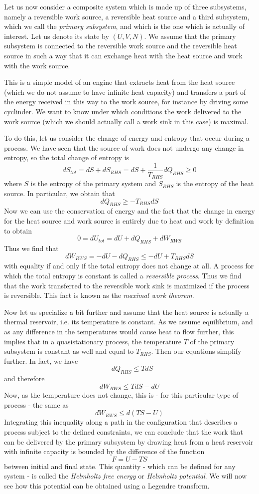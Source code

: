\documentclass[a4paper, draft]{article}
\theoremstyle{own}
\theoremstyle{remark}
\begin{document}
Let us now consider a composite system which is made up of three subsystems, namely a reversible work source, a reversible heat source and a third subsystem, which we call the {\em primary subsystem}, and which is the one which is actually of interest. Let us denote its state by $(U,V,N)$. We assume that the primary subsystem is connected to the reversible work source and the reversible heat source in such a way that it can exchange heat with the heat source and work with the work source.

This is a simple model of an engine that extracts heat from the heat source (which we do not assume to have infinite heat capacity) and transfers a part of the energy received in this way to the work source, for instance by driving some cyclinder. We want to know under which conditions the work delivered to the work source (which we should actually call a work sink in this case) is maximal.

To do this, let us consider the change of energy and entropy that occur during a process. We have seen that the source of work does not undergo any change in entropy, so the total change of entropy is
$$
dS_{tot} = dS + dS_{RHS} = dS + \frac{1}{T_{RHS}} dQ_{RHS} \geq 0
$$
where $S$ is the entropy of the primary system and $S_{RHS}$ is the entropy of the heat source. In particular, we obtain that
$$
dQ_{RHS} \geq - T_{RHS} dS
$$
Now we can use the conservation of energy and the fact that the change in energy for the heat source and work source is entirely due to heat and work by definition to obtain
$$
0 = dU_{tot} = dU + dQ_{RHS} + dW_{RWS}
$$
Thus we find that
$$
dW_{RWS} = - dU - dQ_{RHS} \leq -dU + T_{RHS} dS
$$
with equality if and only if the total entropy does not change at all. A process for which the total entropy is constant is called a {\em reversible process}. Thus we find that the work transferred to the reversible work sink is maximized if the process is reversible. This fact is known as the {\em maximal work theorem}.

Now let us specialize a bit further and assume that the heat source is actually a thermal reservoir, i.e. its temperature is constant. As we assume equilibrium, and as any difference in the temperatures would cause heat to flow further, this implies that in a quasistationary process, the temperature $T$ of the primary subsystem is constant as well and equal to $T_{RHS}$. Then our equations simplify further. In fact, we have
$$
- dQ_{RHS} \leq T dS
$$
and therefore
$$
dW_{RWS} \leq T dS - dU
$$
Now, as the temperature does not change, this is - for this particular type of process - the same as
$$
dW_{RWS} \leq d (TS - U)
$$
Integrating this inequality along a path in the configuration that describes a process subject to the defined constraints, we can conclude that the work that can be delivered by the primary subsystem by drawing heat from a heat reservoir with infinite capacity is bounded by the difference of the function
$$
F = U - TS
$$
between initial and final state. This quantity - which can be defined for any system - is called the {\em Helmholtz free energy} or {\em Helmholtz potential}. We will now see how this potential can be obtained using a Legendre transform.
\end{document}
